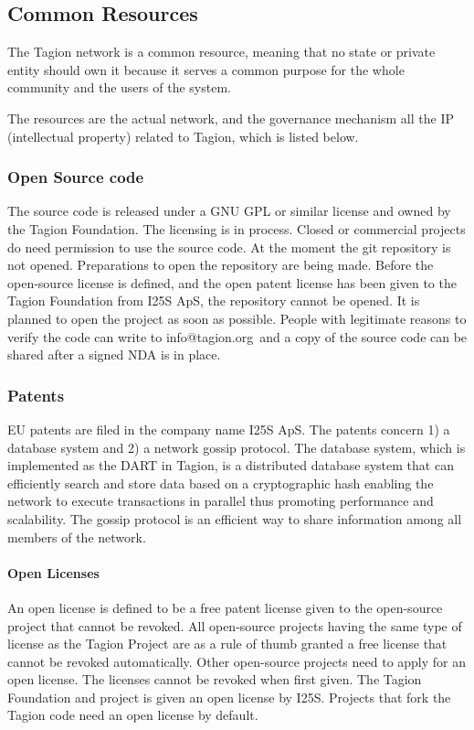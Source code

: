 \subsection{Common Resources} \label{sec:common_resources}
The Tagion network is a common resource, meaning that no state or private entity should own it because it serves a common purpose for the whole community and the users of the system. 

The resources are the actual network, and the governance mechanism all the IP (intellectual property) related to Tagion, which is listed below.

\subsubsection{Open Source code}
The source code is released under a GNU GPL or similar license and owned by the Tagion Foundation. The licensing is in process. Closed or commercial projects do need permission to use the source code.
At the moment the git repository is not opened. Preparations to open the repository are being made.
Before the open-source license is defined, and the open patent license has been given to the Tagion Foundation from I25S ApS, the repository cannot be opened. It is planned to open the project as soon as possible. People with legitimate reasons to verify the code can write to info@tagion.org and a copy of the source code can be shared after a signed NDA is in place.

\subsubsection{Patents}
EU patents are filed in the company name I25S ApS. The patents concern 1) a database system and 2) a network gossip protocol.
The database system, which is implemented as the DART in Tagion, is a distributed database system that can efficiently search and store data based on a cryptographic hash enabling the network to execute transactions in parallel thus promoting performance and scalability.
The gossip protocol is an efficient way to share information among all members of the network.

\paragraph{Open Licenses}
An open license is defined to be a free patent license given to the open-source project that cannot be revoked.
All open-source projects having the same type of license as the Tagion Project are as a rule of thumb granted a free license that cannot be revoked automatically.
Other open-source projects need to apply for an open license. The licenses cannot be revoked when first given.
The Tagion Foundation and project is given an open license by I25S. Projects that fork the Tagion code need an open license by default.

